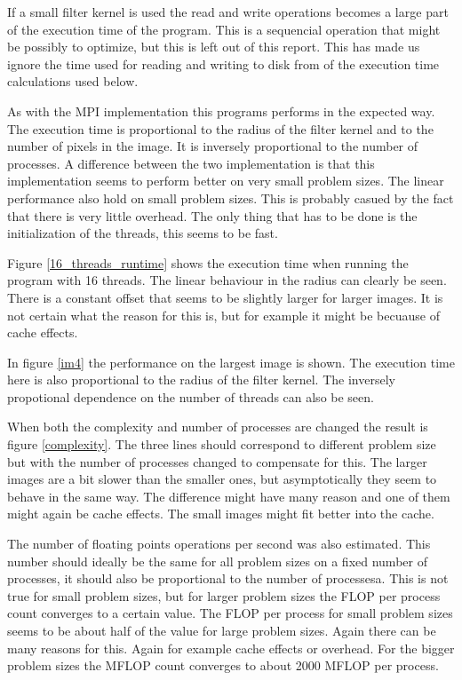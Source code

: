 \documentclass[a4paper,11pt]{article}
\begin{document}
If a small filter kernel is used the read and write operations becomes a large part of the execution time of the program.
This is a sequencial operation that might be possibly to optimize, but this is left out of this report.
This has made us ignore the time used for reading and writing to disk from of the execution time calculations used below.

As with the MPI implementation this programs performs in the expected way. 
The execution time is proportional to the radius of the filter kernel and to the number of pixels in the image.
It is inversely proportional to the number of processes.
A difference between the two implementation is that this implementation seems to perform better on very small problem sizes.
The linear performance also hold on small problem sizes.
This is probably casued by the fact that there is very little overhead.
The only thing that has to be done is the initialization of the threads, this seems to be fast.

Figure \ref{16_threads_runtime} shows the execution time when running the program with 16 threads.
The linear behaviour in the radius can clearly be seen.
There is a constant offset that seems to be slightly larger for larger images.
It is not certain what the reason for this is, but for example it might be becuause of cache effects.

In figure \ref{im4} the performance on the largest image is shown.
The execution time here is also proportional to the radius of the filter kernel.
The inversely propotional dependence on the number of threads can also be seen.

When both the complexity and number of processes are changed the result is figure \ref{complexity}.
The three lines should correspond to different problem size but with the number of processes changed to compensate for this.
The larger images are a bit slower than the smaller ones, but asymptotically they seem to behave in the same way.
The difference might have many reason and one of them might again be cache effects.
The small images might fit better into the cache.

The number of floating points operations per second was also estimated.
This number should ideally be the same for all problem sizes on a fixed number of processes, it should also be proportional to the number of processesa.
This is not true for small problem sizes, but for larger problem sizes the FLOP per process count converges to a certain value.
The FLOP per process for small problem sizes seems to be about half of the value for large problem sizes.
Again there can be many reasons for this. Again for example cache effects or overhead.
For the bigger problem sizes the MFLOP count converges to about 2000 MFLOP per process.
\end{document}
